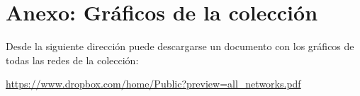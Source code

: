 %
%
%

\section{Anexo: Gráficos de la colección}

Desde la siguiente dirección puede descargarse un documento con los gráficos de todas las redes de la colección:

\url{https://www.dropbox.com/home/Public?preview=all_networks.pdf}

